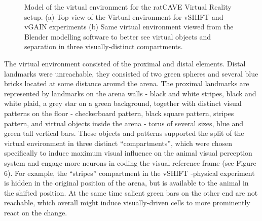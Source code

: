 \begin{figure}
\captionsetup{format=plain}
\caption[Virtual scene]{
Model of the virtual environment for the ratCAVE Virtual Reality setup. (a) Top view of the Virtual environment for vSHIFT and vGAIN experiments (b) Same virtual environment viewed from the Blender modelling software to better see virtual objects and separation in three visually-distinct compartments.
}
\label{fig:F6_virtual_scene}
\end{figure}

The virtual environment consisted of the proximal and distal elements. Distal landmarks were unreachable, they consisted of two green spheres and several blue bricks located at some distance around the arena. The proximal landmarks are represented by landmarks on the arena walls - black and white stripes, black and white plaid, a grey star on a green background, together with distinct visual patterns on the floor - checkerboard pattern, black square pattern, stripes pattern, and virtual objects inside the arena - torus of several sizes, blue and green tall vertical bars. These objects and patterns supported the split of the virtual environment in three distinct “compartments”, which were chosen specifically to induce maximum visual influence on the animal visual perception system and engage more neurons in coding the visual reference frame (see Figure 6). For example, the “stripes” compartment in the vSHIFT -physical experiment is hidden in the original position of the arena, but is available to the animal in the shifted position. At the same time salient green bars on the other end are not reachable, which overall might induce visually-driven cells to more prominently react on the change.

